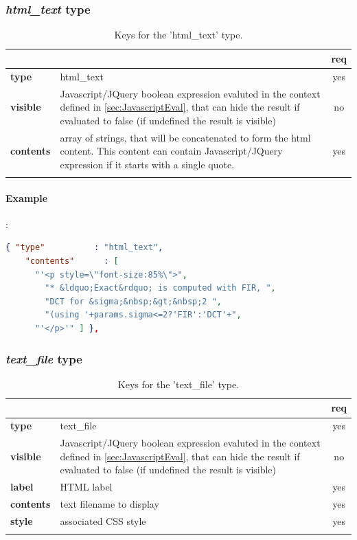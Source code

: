 \subsubsection{ \emph{html\_text} type}

\begin{longtable}{|>{\bf}L{\linewidth}|L{\linewidth}|c|}
\hline
{}     &  & {\bf req} \tabularnewline 
\hline \hline
 type      & html\_text  & yes \\ \hline
 visible   & Javascript/JQuery boolean expression evaluted in the context 
             defined in \ref{sec:JavascriptEval}, that can hide the result if
             evaluated to false (if undefined the result is visible)& no \\ \hline
 contents  & array of strings, that will be concatenated to form the html 
             content. This content can contain Javascript/JQuery expression if it starts
            with a single quote. & yes \\ \hline
\caption{Keys for the 'html\_text' type.}
\end{longtable}

\paragraph{Example}:\\
\begin{lstlisting}[language=json,firstnumber=1]
  { "type"          : "html_text", 
    "contents"      : [
      "'<p style=\"font-size:85%\">",
        "* &ldquo;Exact&rdquo; is computed with FIR, ",
        "DCT for &sigma;&nbsp;&gt;&nbsp;2 ",
        "(using '+params.sigma<=2?'FIR':'DCT'+",
      "'</p>'" ] },
\end{lstlisting}


\subsubsection{ \emph{text\_file} type}

\begin{longtable}{|>{\bf}L{\linewidth}|L{\linewidth}|c|}
\hline
{}     &  & {\bf req} \tabularnewline 
\hline \hline
 type      & text\_file  & yes \\ \hline
 visible   & Javascript/JQuery boolean expression evaluted in the context 
              defined in \ref{sec:JavascriptEval}, that can hide the result if
             evaluated to false (if undefined the result is visible)& no \\ \hline
 label     & HTML label & yes \\ \hline
 contents  & text filename to display & yes \\ \hline
 style     & associated CSS style & yes \\ \hline
\caption{Keys for the 'text\_file' type.}
\end{longtable}

